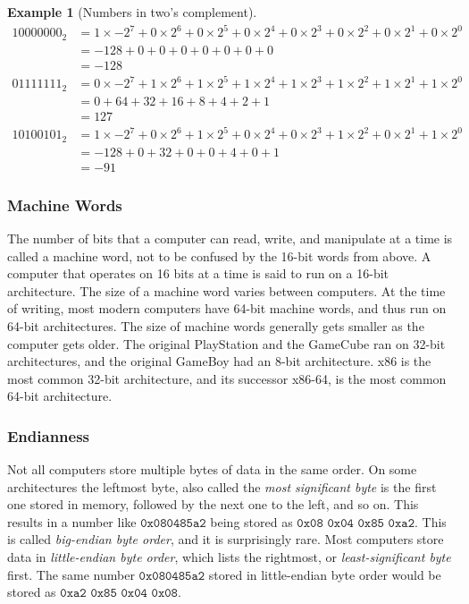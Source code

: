 \documentclass{article}
\newtheorem{exmp}{Example}[section]
\begin{document}
\begin{exmp}[Numbers in two's complement]
\begin{align*}
10000000_2 & = 1 \times -2^7 + 0 \times 2^6 + 0 \times 2^5 + 0 \times 2^4 + 0 \times 2^3 + 0 \times 2^2 + 0 \times 2^1 + 0 \times 2^0 \\
           & = -128 + 0 + 0 + 0 + 0 + 0 + 0 + 0 \\
           & = -128 \\
01111111_2 & = 0 \times -2^7 + 1 \times 2^6 + 1 \times 2^5 + 1 \times 2^4 + 1 \times 2^3 + 1 \times 2^2 + 1 \times 2^1 + 1 \times 2^0 \\
           & = 0 + 64 + 32 + 16 + 8 + 4 + 2 + 1 \\
           & = 127 \\
10100101_2 & = 1 \times -2^7 + 0 \times 2^6 + 1 \times 2^5 + 0 \times 2^4 + 0 \times 2^3 + 1 \times 2^2 + 0 \times 2^1 + 1 \times 2^0 \\
           & = -128 + 0 + 32 + 0 + 0 + 4 + 0 + 1 \\
           & = -91
\end{align*}
\end{exmp}

\subsubsection{Machine Words}
The number of bits that a computer can read, write, and manipulate at a time is
called a machine word, not to be confused by the 16-bit words from above. A
computer that operates on 16 bits at a time is said to run on a 16-bit
architecture. The size of a machine word varies between computers. At the time
of writing, most modern computers have 64-bit machine words, and thus run on
64-bit architectures. The size of machine words generally gets smaller as the
computer gets older. The original PlayStation and the GameCube ran on 32-bit
architectures, and the original GameBoy had an 8-bit architecture. x86 is the
most common 32-bit architecture, and its successor x86-64, is the most common
64-bit architecture.

\subsubsection{Endianness}
Not all computers store multiple bytes of data in the same order. On some
architectures the leftmost byte, also called the \emph{most significant byte} is
the first one stored in memory, followed by the next one to the left, and so on.
This results in a number like $\texttt{0x080485a2}$ being stored as
$\texttt{0x08}$ $\texttt{0x04}$ $\texttt{0x85}$ $\texttt{0xa2}$. This is called
\emph{big-endian byte order}, and it is surprisingly rare. Most computers store
data in \emph{little-endian byte order}, which lists the rightmost, or
\emph{least-significant byte} first. The same number $\texttt{0x080485a2}$
stored in little-endian byte order would be stored as $\texttt{0xa2}$
$\texttt{0x85}$ $\texttt{0x04}$ $\texttt{0x08}$.
\end{document}
